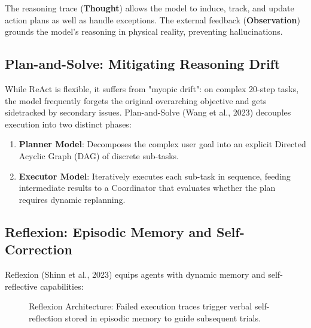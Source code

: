 The reasoning trace (\textbf{Thought}) allows the model to induce, track, and update action plans as well as handle exceptions. The external feedback (\textbf{Observation}) grounds the model's reasoning in physical reality, preventing hallucinations.

\subsection{Plan-and-Solve: Mitigating Reasoning Drift}
While ReAct is flexible, it suffers from "myopic drift": on complex 20-step tasks, the model frequently forgets the original overarching objective and gets sidetracked by secondary issues.
Plan-and-Solve (Wang et al., 2023) decouples execution into two distinct phases:
\begin{enumerate}[leftmargin=18pt]
  \item \textbf{Planner Model}: Decomposes the complex user goal into an explicit Directed Acyclic Graph (DAG) of discrete sub-tasks.
  \item \textbf{Executor Model}: Iteratively executes each sub-task in sequence, feeding intermediate results to a Coordinator that evaluates whether the plan requires dynamic replanning.
\end{enumerate}

\subsection{Reflexion: Episodic Memory and Self-Correction}
Reflexion (Shinn et al., 2023) equips agents with dynamic memory and self-reflective capabilities:

\begin{figure}[htbp]
\centering
{}
\caption{Reflexion Architecture: Failed execution traces trigger verbal self-reflection stored in episodic memory to guide subsequent trials.}
\label{fig:reflexion_arch}
\end{figure}

